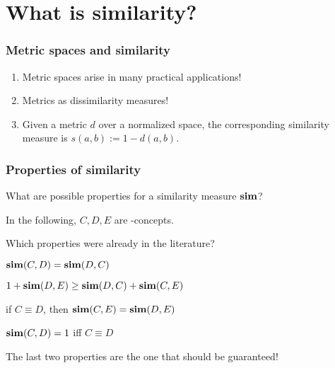\documentclass{beamer}
\begin{document}
\section{What is similarity?}

\begin{frame}
  \frametitle{Metric spaces and similarity}
  \begin{enumerate}
    \item Metric spaces arise in many practical
    applications!
    \item Metrics as \alert{dissimilarity} measures!
    \item Given a metric \(d\) over a normalized space,
    the corresponding \alert{similarity} measure is
    \(
      s(a,b) := 1 - d(a,b)
    \).
  \end{enumerate}  
\end{frame}

\begin{frame}
  \frametitle{Properties of similarity}
  What are possible properties for a
  \alert{similarity measure} \(\operatorname{\mathbf{sim}}\)?

  In the following, \(C,D,E\) are \elh-concepts.

  Which properties were already in the literature?

  \begin{description}[<+->]
    \item[Symmetric] \(\operatorname{\mathbf{sim}}(C,D) = \operatorname{\mathbf{sim}}(D,C)\)
    \item[Triangle inequality]
      \(1 + \operatorname{\mathbf{sim}}(D,E) \ge \operatorname{\mathbf{sim}}(D,C) + \operatorname{\mathbf{sim}}(C,E)\)
    \item[Equivalence invariant]
      if \(C \equiv D\), then
      \(\operatorname{\mathbf{sim}}(C,E) = \operatorname{\mathbf{sim}}(D,E)\)
    \item[Equivalence closed]
      \(\operatorname{\mathbf{sim}}(C,D) = 1\) iff \(C \equiv D\)
  \end{description}
  The last two properties are the one that should
  be guaranteed!
\end{frame}
\end{document}
